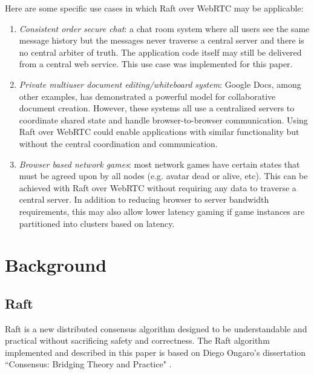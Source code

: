\documentclass[9pt]{extarticle}
\begin{document}
\begin{multicols}{2}
Here are some specific use cases in which Raft over WebRTC may be
applicable:

\begin{enumerate}
\item \emph{Consistent order secure chat}: a chat room system where
    all users see the same message history but the messages never
    traverse a central server and there is no central arbiter
    of truth. The application code itself may still be delivered from
    a central web service. This use case was implemented
    for this paper.
\item \emph{Private multiuser document editing/whiteboard system}:
    Google Docs, among other examples, has demonstrated a powerful
    model for collaborative document creation. However, these systems
    all use a centralized servers to coordinate shared state and
    handle browser-to-browser communication. %
    Using Raft over WebRTC could enable applications with similar
    functionality but without the central coordination and
    communication.
\item \emph{Browser based network games}: most network games have
    certain states that must be agreed upon by all nodes (e.g. avatar
    dead or alive, etc). This can be achieved with Raft over WebRTC
    without requiring any data to traverse a central server. In
    addition to reducing browser to server bandwidth requirements,
    this may also allow lower latency gaming if game instances are
    partitioned into clusters based on latency.
\end{enumerate}

\section{Background}

\subsection{Raft}

Raft is a new distributed consensus algorithm designed to be
understandable and practical without sacrificing safety and
correctness. The Raft algorithm implemented and described in this
paper is based on Diego Ongaro's dissertation ``Consensus: Bridging
Theory and Practice" \cite{raft_thesis:ongaro14}.


\end{multicols}
\end{document}
